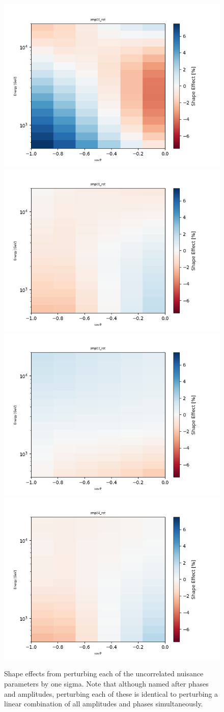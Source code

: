 \documentclass[main.tex]{subfiles}
\begin{document}
\begin{figure}
    \centering
    \includegraphics[width=0.45\linewidth]{figures/amp00_rot.png}%
    \includegraphics[width=0.45\linewidth]{figures/amp01_rot.png}\\
    \includegraphics[width=0.45\linewidth]{figures/amp03_rot.png}%
    \includegraphics[width=0.45\linewidth]{figures/amp04_rot.png}
    \caption{Shape effects from perturbing each of the uncorrelated nuisance parameters by one sigma. Note that although named after phases and amplitudes, perturbing each of these is identical to perturbing a linear combination of all amplitudes and phases simultaneously.}\label{fig:rotata}
\end{figure}
\end{document}
